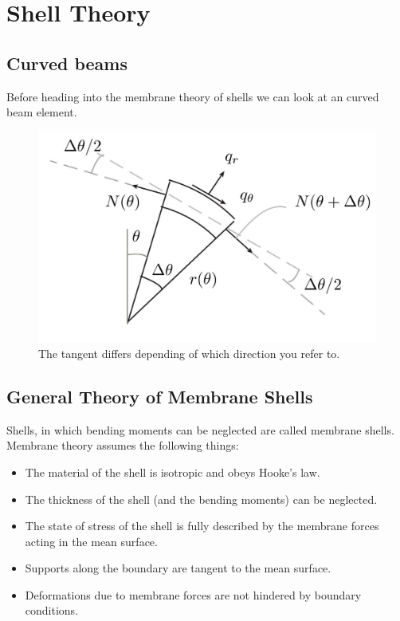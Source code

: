 \section{Shell Theory}




\subsection{Curved beams}

Before heading into the membrane theory of shells we can look at an curved beam element.

\begin{figure}[H]
\centering
\includegraphics[height=0.5\linewidth ]{figure/Theory/CurvedBeam.JPG}
\caption{The tangent differs depending of which direction you refer to. }
\end{figure}
\subsection{General Theory of Membrane Shells}


Shells, in which bending moments can be neglected are called membrane
shells. Membrane theory assumes the following things:

\begin{itemize}
\item The material of the shell is isotropic and obeys Hooke's law.
\item The thickness of the shell (and the bending moments) can be neglected.
\item The state of stress of the shell is fully described by the membrane
forces acting in the mean surface.
\item Supports along the boundary are tangent to the mean surface.
\item Deformations due to membrane forces are not hindered by boundary
conditions.
\end{itemize}


